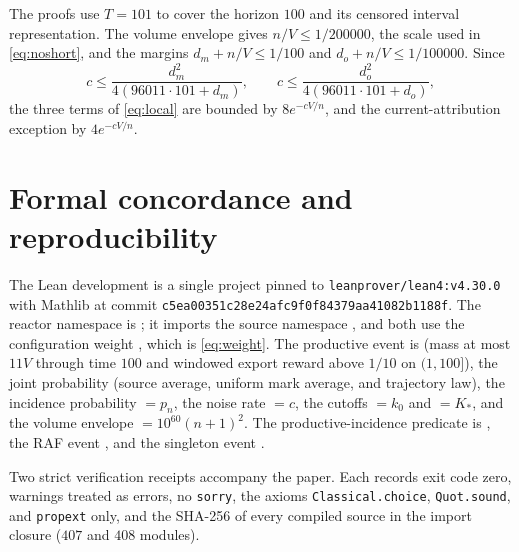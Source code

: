 \documentclass[11pt,letterpaper]{article}
\theoremstyle{plain}
\theoremstyle{definition}
\theoremstyle{remark}
\numberwithin{equation}{section}
\begin{document}
The proofs use $T=101$ to cover the horizon $100$ and its censored interval representation. The volume envelope gives $n/V\le1/200000$, the scale used in \eqref{eq:noshort}, and the margins $d_m+n/V\le1/100$ and $d_o+n/V\le1/100000$. Since
\[
 c\le\frac{d_m^2}{4(96011\cdot101+d_m)},\qquad c\le\frac{d_o^2}{4(96011\cdot101+d_o)},
\]
the three terms of \eqref{eq:local} are bounded by $8e^{-cV/n}$, and the current-attribution exception by $4e^{-cV/n}$.

\section{Formal concordance and reproducibility}\label{app:formal}

The Lean development is a single project pinned to \texttt{leanprover/lean4:v4.30.0} with Mathlib at commit \texttt{c5ea00351c28e24afc9f0f84379aa41082b1188f}. The reactor namespace is ; it imports the source namespace , and both use the configuration weight , which is \eqref{eq:weight}. The productive event is  (mass at most $11V$ through time $100$ and windowed export reward above $1/10$ on $(1,100]$), the joint probability  (source average, uniform mark average, and trajectory law), the incidence probability  $=p_n$, the noise rate  $=c$, the cutoffs  $=k_0$ and  $=K_*$, and the volume envelope  $=10^{60}(n+1)^2$. The productive-incidence predicate is , the RAF event , and the singleton event .

Two strict verification receipts accompany the paper. Each records exit code zero, warnings treated as errors, no \texttt{sorry}, the axioms \texttt{Classical.choice}, \texttt{Quot.sound}, and \texttt{propext} only, and the SHA-256 of every compiled source in the import closure ($407$ and $408$ modules).
\end{document}

